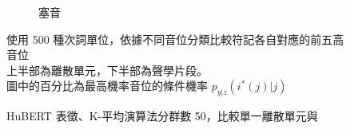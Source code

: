 {\begin{figure}
\begin{subfigure}{\textwidth}
                 \caption{塞音}
                 \label{fig:hub-u050-ap0500-ploobs}
             \end{subfigure}

             \caption{HuBERT 表徵、K-平均演算法分群數 50，比較單一離散單元與}
             使用 500 種次詞單位，依據不同音位分類比較符記各自對應的前五高音位 \\
             上半部為離散單元，下半部為聲學片段。 \\
             圖中的百分比為最高機率音位的條件機率 $p_{y|z}(i^*(j)|j)$
                         \label{fig:hub-u050-phnobserver}
        \end{figure}
    }

